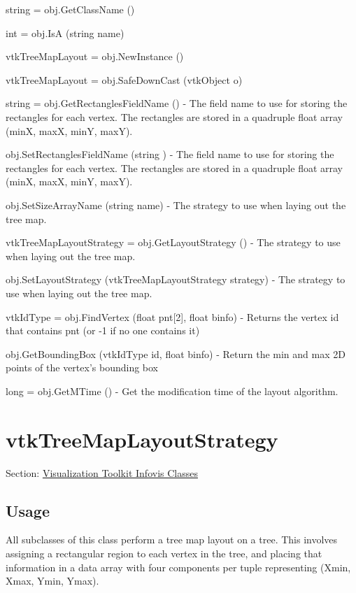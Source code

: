 \begin{DoxyItemize}
\item {\ttfamily string = obj.\-Get\-Class\-Name ()}  
\item {\ttfamily int = obj.\-Is\-A (string name)}  
\item {\ttfamily vtk\-Tree\-Map\-Layout = obj.\-New\-Instance ()}  
\item {\ttfamily vtk\-Tree\-Map\-Layout = obj.\-Safe\-Down\-Cast (vtk\-Object o)}  
\item {\ttfamily string = obj.\-Get\-Rectangles\-Field\-Name ()} -\/ The field name to use for storing the rectangles for each vertex. The rectangles are stored in a quadruple float array (min\-X, max\-X, min\-Y, max\-Y).  
\item {\ttfamily obj.\-Set\-Rectangles\-Field\-Name (string )} -\/ The field name to use for storing the rectangles for each vertex. The rectangles are stored in a quadruple float array (min\-X, max\-X, min\-Y, max\-Y).  
\item {\ttfamily obj.\-Set\-Size\-Array\-Name (string name)} -\/ The strategy to use when laying out the tree map.  
\item {\ttfamily vtk\-Tree\-Map\-Layout\-Strategy = obj.\-Get\-Layout\-Strategy ()} -\/ The strategy to use when laying out the tree map.  
\item {\ttfamily obj.\-Set\-Layout\-Strategy (vtk\-Tree\-Map\-Layout\-Strategy strategy)} -\/ The strategy to use when laying out the tree map.  
\item {\ttfamily vtk\-Id\-Type = obj.\-Find\-Vertex (float pnt\mbox{[}2\mbox{]}, float binfo)} -\/ Returns the vertex id that contains pnt (or -\/1 if no one contains it)  
\item {\ttfamily obj.\-Get\-Bounding\-Box (vtk\-Id\-Type id, float binfo)} -\/ Return the min and max 2\-D points of the vertex's bounding box  
\item {\ttfamily long = obj.\-Get\-M\-Time ()} -\/ Get the modification time of the layout algorithm.  
\end{DoxyItemize}\hypertarget{vtkinfovis_vtktreemaplayoutstrategy}{}\section{vtk\-Tree\-Map\-Layout\-Strategy}\label{vtkinfovis_vtktreemaplayoutstrategy}
Section\-: \hyperlink{sec_vtkinfovis}{Visualization Toolkit Infovis Classes} \hypertarget{vtkwidgets_vtkxyplotwidget_Usage}{}\subsection{Usage}\label{vtkwidgets_vtkxyplotwidget_Usage}
All subclasses of this class perform a tree map layout on a tree. This involves assigning a rectangular region to each vertex in the tree, and placing that information in a data array with four components per tuple representing (Xmin, Xmax, Ymin, Ymax).

